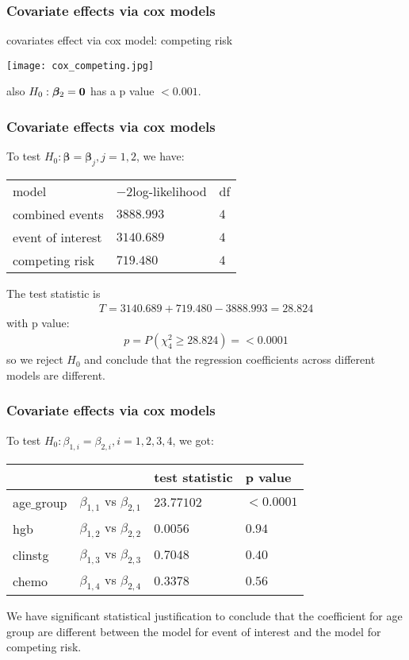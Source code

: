 \documentclass{beamer}[10]
\begin{document}
\begin{frame}
	\frametitle{Covariate effects via cox models}
	covariates effect via cox model: competing risk
	\begin{center}
		\texttt{[image: cox\_competing.jpg]}
	\end{center}
	also $H_0: {\bm \beta}_2 = {\bf 0}$ has a p value $<0.001$.
\end{frame}
\begin{frame}
	\frametitle{Covariate effects via cox models}
	To test $H_0: {\bm \beta} = {\bm \beta}_j, j = 1, 2$, we have:
	\begin{center}
\begin{tabular}{lll}
	\hline
	model&$-2$log-likelihood&df\\
	combined events & $3888.993$&$4$ \\
	event of interest & $3140.689$  &$4$\\
	competing risk & $719.480$&$4$\\
	\hline
\end{tabular}
\end{center}
The test statistic is
\begin{align*}
	T = 3140.689 + 719.480 - 3888.993 = 28.824 
\end{align*}
with p value:
\begin{align*}
	p = P(\chi^2_4 \geq 28.824) = <0.0001 
\end{align*}
so we reject $H_0$ and conclude that the regression coefficients across different models are different.
\end{frame}
\begin{frame}
	\frametitle{Covariate effects via cox models}
	To test $H_0:  \beta_{1, i}= \beta_{2, i}, i = 1, 2, 3, 4$, we got:
\begin{center}
	\begin{tabular}{llll}
	\hline
	&&test statistic&p value\\
	\hline
	age$\_$group&$\beta_{1, 1}$ vs $\beta_{2, 1}$ &$23.77102$&$<0.0001$\\
	hgb&$\beta_{1, 2}$ vs $\beta_{2, 2}$&$0.0056$&$0.94$\\
	clinstg&$\beta_{1, 3}$ vs $\beta_{2, 3}$&$0.7048$&$0.40$\\
	chemo&$\beta_{1, 4}$ vs $\beta_{2, 4}$&$0.3378$&$0.56$\\
	\hline
	\end{tabular}
\end{center}
We have significant statistical justification to conclude that the coefficient for age group are different between the model for event of interest and the model for competing risk.
\end{frame}
\end{document}
